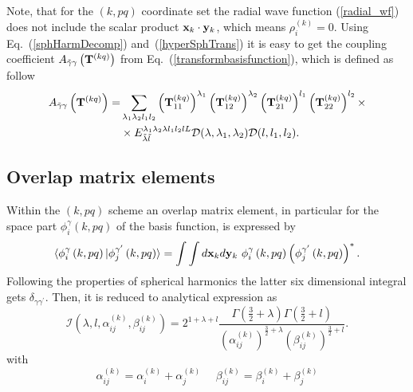 \documentclass[12pt,a4paper,twoside]{article}
\begin{document}
Note, that for the $(k,pq)$ coordinate set the radial wave function (\ref{radial_wf}) does not include the scalar product ${\bf x}_k \cdot {\bf y}_k$, which means $\rho_i^{(k)}=0$.  
 Using Eq.~(\ref{sphHarmDecomp}) and~(\ref{hyperSphTrans}) it is easy to get the coupling coefficient $ A_{\tilde{\gamma} \gamma} \left( {\bf T}^{(kq)} \right) $ from Eq.~(\ref{transformbasisfunction}), which is defined as follow 
 \begin{align}
A_{\tilde{\gamma}\gamma}\left( {\bf T}^{(kq)} \right) = & \sum_{\lambda_1 \lambda_2 l_1 l_2} 
\left({\bf T}_{11}^{(kq)} \right)^{\lambda_1} 
\left({\bf T}_{12}^{(kq)} \right)^{\lambda_2} 
\left({\bf T}_{21}^{(kq)} \right)^{l_1} 
\left({\bf T}_{22}^{(kq)} \right)^{l_2} 
\times \nonumber
\\
& \times {E}^{\lambda_1 \lambda_2 \lambda l_1 l_2 l L}_{\tilde{\lambda} \tilde{l} } \mathcal{D}(\lambda,\lambda_1,\lambda_2) \mathcal{D}(l,l_1,l_2).    
\label{trans_coef}
\end{align}

\subsection{Overlap matrix elements}
Within the $\left(k, pq \right)$ scheme an overlap matrix element, in particular for the space part $ \phi_{i}^{\gamma}\left(k, pq \right)$ of the basis function, is expressed by
\begin{equation}
\langle \phi_{i}^{\gamma}\left(k, pq \right) \vert 
\phi_{j}^{\gamma^{\prime}}\left(k, pq \right) \rangle= \int \int d{\bf x}_k d{\bf y}_k ~\phi_{i}^{\gamma}\left(k, pq \right) \left( \phi_{j}^{\gamma^{\prime}}\left(k, pq \right) \right)^{*}.
\end{equation}
Following the properties of spherical harmonics the latter six dimensional integral gets $\delta_{\gamma \gamma^{\prime}}$. Then, it  is reduced to analytical expression as  
\begin{equation}
\mathcal{I} \left( \lambda,l,\alpha_{ij}^{(k)},\beta_{ij}^{(k)} \right)= 2^{1+\lambda+l}\frac{\Gamma \left( \frac{3}{2}+\lambda \right) \Gamma \left( \frac{3}{2}+l \right) }{ \left( \alpha_{ij}^{(k)} \right) ^{\frac{3}{2}+\lambda} \left( \beta_{ij}^{(k)} \right) ^{\frac{3}{2}+l}} .
\end{equation}
with 
\begin{equation}
\alpha_{ij}^{(k)}=\alpha_{i}^{(k)}+\alpha_{j}^{(k)}~~~~~~
\beta_{ij}^{(k)}=\beta_{i}^{(k)}+\beta_{j}^{(k)}
\end{equation}
\end{document}
